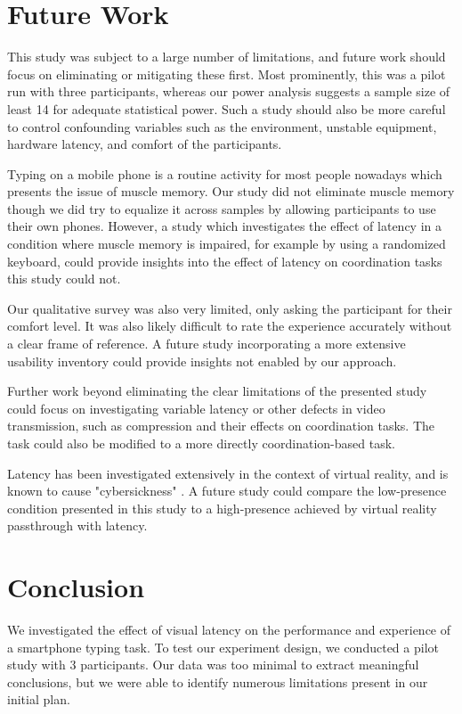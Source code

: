 \section{Future Work}
This study was subject to a large number of limitations, and future work should focus on eliminating or mitigating these first. Most prominently, this was a pilot run with three participants, whereas our power analysis suggests a sample size of least 14 for adequate statistical power. Such a study should also be more careful to control confounding variables such as the environment, unstable equipment, hardware latency, and comfort of the participants. 

Typing on a mobile phone is a routine activity for most people nowadays which presents the issue of muscle memory. Our study did not eliminate muscle memory though we did try to equalize it across samples by allowing participants to use their own phones. However, a study which investigates the effect of latency in a condition where muscle memory is impaired, for example by using a randomized keyboard, could provide insights into the effect of latency on coordination tasks this study could not.

Our qualitative survey was also very limited, only asking the participant for their comfort level. It was also likely difficult to rate the experience accurately without a clear frame of reference. A future study incorporating a more extensive usability inventory could provide insights not enabled by our approach. 

Further work beyond eliminating the clear limitations of the presented study could focus on investigating variable latency or other defects in video transmission, such as compression and their effects on coordination tasks. The task could also be modified to a more directly coordination-based task. 

Latency has been investigated extensively in the context of virtual reality, and is known to cause "cybersickness" \cite{stauffert2020latency}. A future study could compare the low-presence condition presented in this study to a high-presence achieved by virtual reality passthrough with latency. 

\section{Conclusion}
We investigated the effect of visual latency on the performance and experience of a smartphone typing task. To test our experiment design, we conducted a pilot study with 3 participants. Our data was too minimal to extract meaningful conclusions, but we were able to identify numerous limitations present in our initial plan. 


